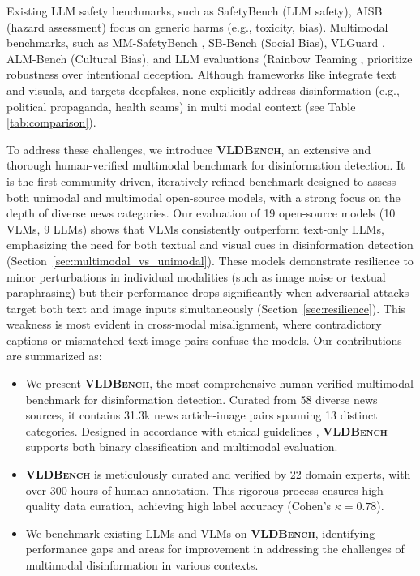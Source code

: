 Existing LLM safety benchmarks, such as SafetyBench \cite{zhang2023safetybench} (LLM safety), AISB \cite{vidgen2024introducingv05aisafety} (hazard assessment) focus on generic harms (e.g., toxicity, bias). 
Multimodal benchmarks, such as MM-SafetyBench \cite{liu2025mm}, SB-Bench \cite{narnaware2025sb} (Social Bias), VLGuard \cite{zong2024safety}, ALM-Bench \cite{vayani2024all} (Cultural Bias), and LLM evaluations (Rainbow Teaming \cite{samvelyan2024rainbowteaming}, 
prioritize robustness over intentional deception. Although frameworks like \cite{papado2023misinformer,Qi_2024_CVPR} integrate text and visuals, and \cite{li2024towards} targets deepfakes, none explicitly address disinformation (e.g., political propaganda, health scams) in multi modal context  (see Table \ref{tab:comparison}).

To address these challenges, we introduce \textsf{\textbf{\textsc{VLDBench}}}, an extensive and thorough human-verified multimodal benchmark for disinformation detection. It is the first community-driven, iteratively refined benchmark designed to assess both unimodal and multimodal open-source models, with a strong focus on the depth of diverse news categories. Our evaluation of 19 open-source models (10 VLMs, 9 LLMs) shows that VLMs consistently outperform text-only LLMs, emphasizing the need for both textual and visual cues in disinformation detection (Section~\ref{sec:multimodal_vs_unimodal}). These models demonstrate resilience to minor perturbations in individual modalities (such as image noise or textual paraphrasing) but their performance drops significantly when adversarial attacks target both text and image inputs simultaneously (Section~\ref{sec:resilience}). This weakness is most evident in cross-modal misalignment, where contradictory captions or mismatched text-image pairs confuse the models. Our contributions are summarized as:
\begin{itemize}[itemsep=0pt]
    \item We present \textsf{\textbf{\textsc{VLDBench}}}, the most comprehensive human-verified multimodal benchmark for disinformation detection. Curated from 58 diverse news sources, it contains 31.3k news article-image pairs spanning 13 distinct categories. Designed in accordance with ethical guidelines \cite{uwaterloo_ethics_review}, \textsf{\textbf{\textsc{VLDBench}}} supports both binary classification and multimodal evaluation.
    \item \textsf{\textbf{\textsc{VLDBench}}} is meticulously curated and verified by 22 domain experts, with over 300 hours of human annotation. This rigorous process ensures high-quality data curation, achieving high label accuracy (Cohen’s $\kappa = 0.78$).
    \item We benchmark existing LLMs and VLMs on \textsf{\textbf{\textsc{VLDBench}}}, identifying performance gaps and areas for improvement in addressing the challenges of multimodal disinformation in various contexts. 
\end{itemize}
